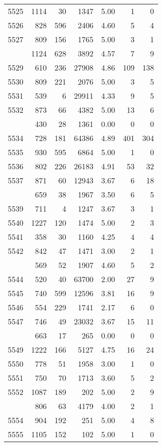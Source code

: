 \documentclass[
]{article}
\begin{document}
\begin{table}
\begin{tabular}[t]{lrrrrrr}
5525 & 1114 & 30 & 1347 & 5.00 & 1 & 0\\
5526 & 828 & 596 & 2406 & 4.60 & 5 & 4\\
5527 & 809 & 156 & 1765 & 5.00 & 3 & 1\\
\addlinespace
5528 & 1124 & 628 & 3892 & 4.57 & 7 & 9\\
5529 & 610 & 236 & 27908 & 4.86 & 109 & 138\\
5530 & 809 & 221 & 2076 & 5.00 & 3 & 5\\
5531 & 539 & 6 & 29911 & 4.33 & 9 & 5\\
5532 & 873 & 66 & 4382 & 5.00 & 13 & 6\\
\addlinespace
5533 & 430 & 28 & 1361 & 0.00 & 0 & 0\\
5534 & 728 & 181 & 64386 & 4.89 & 401 & 304\\
5535 & 930 & 595 & 6864 & 5.00 & 1 & 0\\
5536 & 802 & 226 & 26183 & 4.91 & 53 & 32\\
5537 & 871 & 60 & 12943 & 3.67 & 6 & 18\\
\addlinespace
5538 & 659 & 38 & 1967 & 3.50 & 6 & 5\\
5539 & 711 & 4 & 1247 & 3.67 & 3 & 1\\
5540 & 1227 & 120 & 1474 & 5.00 & 2 & 3\\
5541 & 358 & 30 & 1160 & 4.25 & 4 & 4\\
5542 & 842 & 47 & 1471 & 3.00 & 2 & 1\\
\addlinespace
5543 & 569 & 52 & 1907 & 4.60 & 5 & 2\\
5544 & 520 & 40 & 63700 & 2.00 & 27 & 9\\
5545 & 740 & 599 & 12596 & 3.81 & 16 & 9\\
5546 & 554 & 229 & 1741 & 2.17 & 6 & 0\\
5547 & 746 & 49 & 23032 & 3.67 & 15 & 11\\
\addlinespace
5548 & 663 & 17 & 265 & 0.00 & 0 & 0\\
5549 & 1222 & 166 & 5127 & 4.75 & 16 & 24\\
5550 & 778 & 51 & 1958 & 3.00 & 1 & 0\\
5551 & 750 & 70 & 1713 & 3.60 & 5 & 2\\
5552 & 1087 & 189 & 202 & 5.00 & 2 & 9\\
\addlinespace
5553 & 806 & 63 & 4179 & 4.00 & 2 & 1\\
5554 & 904 & 192 & 251 & 5.00 & 4 & 8\\
5555 & 1105 & 152 & 102 & 5.00 & 1 & 0\\

\end{tabular}
\end{table}
\end{document}
